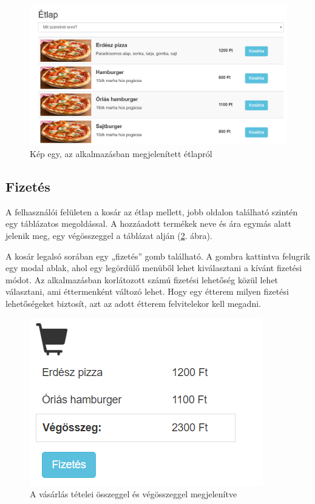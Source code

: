 \begin{figure}
\centering
\includegraphics[scale=0.5]{kepek/menu.png}
\caption{Kép egy, az alkalmazásban megjelenített étlapról}
\label{fig:menu}
\end{figure}

\subsection{Fizetés}

A felhasználói felületen a kosár az étlap mellett, jobb oldalon található szintén egy táblázatos megoldással. A hozzáadott termékek neve és ára egymás alatt jelenik meg, egy végösszeggel a táblázat alján (\ref{fig:order}. ábra).

A kosár legalsó sorában egy „fizetés” gomb található. A gombra kattintva felugrik egy modal ablak, ahol egy legördülő menüből lehet kiválasztani a kívánt fizetési módot. Az alkalmazásban korlátozott számú fizetési lehetőség közül lehet választani, ami éttermenként változó lehet. Hogy egy étterem milyen fizetési lehetőségeket biztosít, azt az adott étterem felvitelekor kell megadni.

\begin{figure}
\centering
\includegraphics[scale=0.8]{kepek/order.png}
\caption{A vásárlás tételei összeggel és végösszeggel megjelenítve}
\label{fig:order}
\end{figure}


